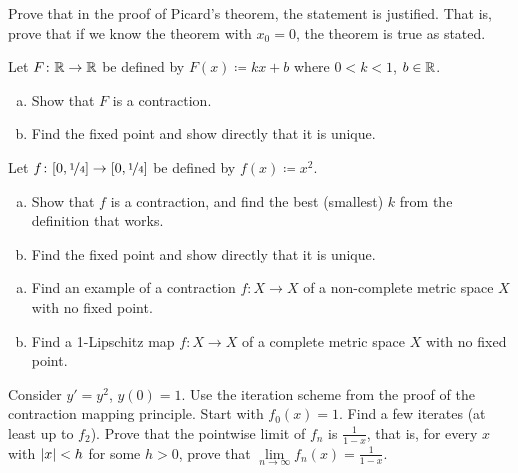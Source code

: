 \begin{exercise}
Prove that in the proof of Picard's theorem,
the statement  is
justified.  That is, prove that if we know the theorem with $x_0 = 0$, the
theorem is true as stated.
\end{exercise}

\begin{exercise}
\pagebreak[2]
Let $F \colon {\mathbb{R}} \to {\mathbb{R}}$ be defined by
$F(x) \coloneqq kx + b$ where $0 < k < 1$, $b \in {\mathbb{R}}$.
\begin{enumerate}[a)]
\item
Show that $F$ is a contraction.
\item
Find the fixed point and show directly that it is unique.
\end{enumerate}
\end{exercise}

\begin{exercise}
\pagebreak[2]
Let $f \colon [0,\nicefrac{1}{4}] \to [0,\nicefrac{1}{4}]$ be defined by
$f(x) \coloneqq x^2$.
\begin{enumerate}[a)]
\item
Show that $f$
is a contraction, and find the best (smallest) $k$ from the definition that works.
\item
Find the fixed point and show directly that it is unique.
\end{enumerate}
\end{exercise}

\begin{samepage}
\begin{exercise} \label{exercise:nofixedpoint}
\leavevmode
\begin{enumerate}[a)]
\item
Find an example of a contraction $f \colon X \to X$
of a non-complete metric space $X$ with no
fixed point.
\item
Find a 1-Lipschitz map $f \colon X \to X$ of a complete metric space $X$ with no fixed point.
\end{enumerate}
\end{exercise}
\end{samepage}

\begin{exercise}
Consider $y' =y^2$, $y(0)=1$.  Use the iteration scheme
from the proof of the contraction mapping principle.
Start with $f_0(x) = 1$.  Find a 
few iterates (at least up to $f_2$).  Prove that
the pointwise limit of $f_n$ is $\frac{1}{1-x}$, that is, for every $x$
with $\lvert {x} \rvert < h$ for some $h > 0$,
prove that $\lim\limits_{n\to\infty}f_n(x) = \frac{1}{1-x}$.
\end{exercise}

